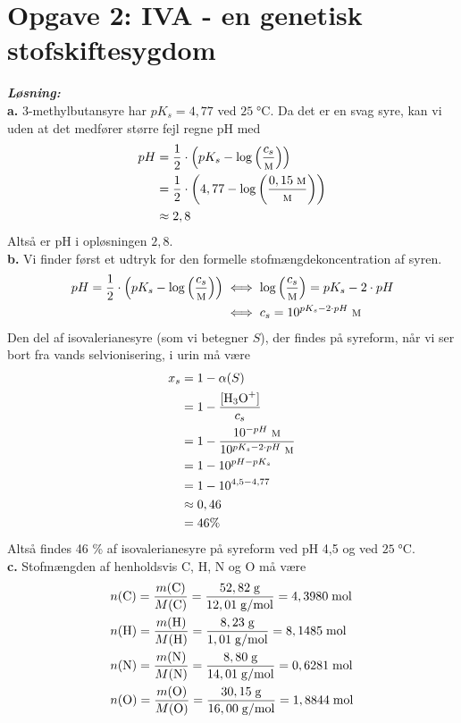 \documentclass{report}
\newcommand{\sol}{\setlength{\parindent}{0cm}\textbf{\textit{Løsning:}}\setlength{\parindent}{1cm}}
\begin{document}
\section*{Opgave 2: IVA - en genetisk stofskiftesygdom}
\sol \\
\textbf{a.}
3-methylbutansyre har $pK_s=4,77$ ved $25 \;\unit{\celsius} $.
Da det er en svag syre, kan vi uden at det medfører større fejl regne pH med
\begin{equation*}
\begin{split}
  pH&=\frac{1}{2} \cdot \left(pK_s- \log\left(\frac{c_s}{\unit{\textsc{m}}}\right) \right) \\
  &=\frac{1}{2} \cdot \left(4,77 - \log\left(\frac{0,15 \;\unit{\textsc{m}} }{\unit{\textsc{m}}}\right) \right) \\
  &\approx 2,8
\end{split}
\end{equation*}
Altså er pH i opløsningen $2,8$.\\[1ex]
\textbf{b.}
Vi finder først et udtryk for den formelle stofmængdekoncentration af syren.
\begin{equation*}
\begin{split}
  pH=\frac{1}{2} \cdot \left(pK_s- \log\left(\frac{c_s}{\unit{\textsc{m}}}\right) \right) &\iff \log\left(\frac{c_s}{\unit{\textsc{m}}}\right) =pK_s-2 \cdot pH\\
  &\iff c_s=10 ^{pK_s-2 \cdot pH} \;\unit{\textsc{m}} 
\end{split}
\end{equation*}
Den del af isovalerianesyre (som vi betegner $S$), der findes på syreform, når vi ser bort fra vands selvionisering, i urin må være
\begin{equation*}
\begin{split}
  x_s&=1-\alpha(S)\\
  &=1-\frac{[\ce{H3O+} ]}{c_s}\\
  &=1-\frac{10 ^{-pH} \;\unit{\textsc{m}} }{10 ^{pK_s-2 \cdot pH} \;\unit{\textsc{m}}}\\
  &=1-10^{pH-pK_s}\\
  &=1-10 ^{4,5-4,77}\\
  &\approx 0,46\\
  &=46 \%
\end{split}
\end{equation*}
Altså findes 46 \% af isovalerianesyre på syreform ved pH 4,5 og ved $25 \;\unit{\celsius} $.\\[1ex]
\textbf{c.}
Stofmængden af henholdsvis C, H, N og O må være
\begin{equation*}
\begin{split}
  &n(\ce{C})=\frac{m(\ce{C})}{M(\ce{C})}=\frac{52,82 \;\unit{g} }{12,01 \;\unit{g/mol} }=4,3980 \;\unit{mol}  \\
  &n(\ce{H})=\frac{m(\ce{H})}{M(\ce{H})}=\frac{8,23 \;\unit{g} }{1,01 \;\unit{g/mol} }=8,1485 \;\unit{mol} \\
  &n(\ce{N})=\frac{m(\ce{N})}{M(\ce{N})}=\frac{8,80 \;\unit{g} }{14,01 \;\unit{g/mol} }=0,6281 \;\unit{mol} \\
  &n(\ce{O})=\frac{m(\ce{O})}{M(\ce{O})}=\frac{30,15 \;\unit{g} }{16,00 \;\unit{g/mol} }=1,8844 \;\unit{mol} 
\end{split}
\end{equation*}
\end{document}
